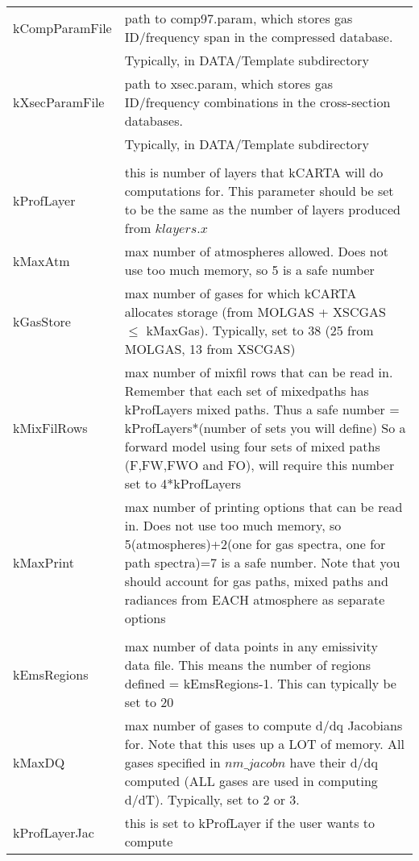 \documentclass[12pt]{article}
\newlength{\colwidth}
\begin{document}
\begin{longtable}{|l|p{\colwidth}|}
kCompParamFile & path to {\sf comp97.param}, which stores gas ID/frequency
               span in the compressed database.\\
              & Typically, in DATA/Template subdirectory\\ 
kXsecParamFile & path to {\sf xsec.param}, which stores gas ID/frequency
               combinations in the cross-section databases.\\ 
              & Typically, in DATA/Template subdirectory\\ \hline
           & \\
kProfLayer & this is number of layers that kCARTA will do computations for.
             This parameter should be set to be the same as the number of 
             layers produced from $klayers.x$\\
kMaxAtm    & max number of atmospheres allowed. 
           Does not use too much memory, so 5 is a safe number\\ \hline
kGasStore  &  max number of gases for which kCARTA allocates storage
           (from MOLGAS + XSCGAS  $\le$  kMaxGas).  Typically, set to 38
           (25 from MOLGAS, 13 from XSCGAS) \\ 
kMixFilRows& max number of mixfil rows that can be read in.
         Remember that each set of mixedpaths has kProfLayers mixed paths. 
         Thus a safe number = kProfLayers*(number of sets you will define)
         So a forward model using four sets of mixed paths (F,FW,FWO and FO), 
         will require this number set to 4*kProfLayers\\
kMaxPrint  & max number of printing options that can be read in.  Does not use 
            too much memory, so 5(atmospheres)+2(one for gas spectra, one 
            for path spectra)=7 is a safe number. 
           Note that you should account for gas paths, mixed paths and
           radiances from EACH atmosphere as separate options\\ \hline
         & \\
kEmsRegions & max number of data points in any emissivity data file.
            This means the number of regions defined = kEmsRegions-1.
            This can typically be set to 20\\ 
kMaxDQ     & max number of gases to compute d/dq Jacobians for.
           Note that this uses up a LOT of memory.  All gases specified in
           $nm\_jacobn$ have their d/dq computed (ALL gases are used in 
           computing d/dT).  Typically, set to 2 or 3.\\ 
kProfLayerJac  & this is set to kProfLayer if the user wants to compute 

\end{longtable}
\end{document}

